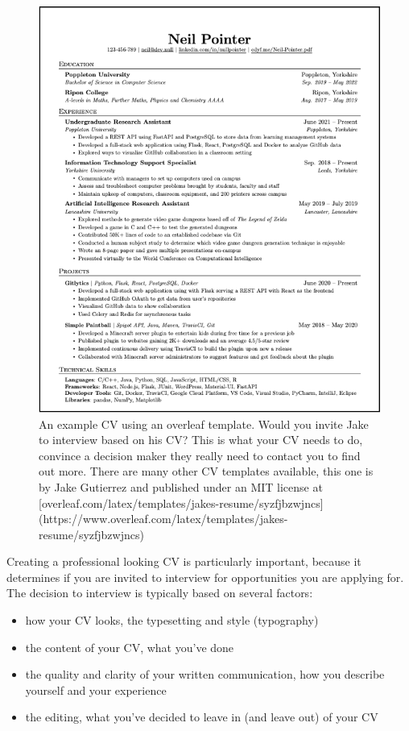 \documentclass[
]{book}
\providecommand{\tightlist}{%
  \setlength{\itemsep}{0pt}\setlength{\parskip}{0pt}}
\begin{document}
\begin{figure}

{\centering \includegraphics[width=1\linewidth]{images/jake-ryan} 

}

\caption{An example CV using an overleaf template. Would you invite Jake to interview based on his CV? This is what your CV needs to do, convince a decision maker they really need to contact you to find out more. There are many other CV templates available, this one is by Jake Gutierrez and published under an MIT license at [overleaf.com/latex/templates/jakes-resume/syzfjbzwjncs](https://www.overleaf.com/latex/templates/jakes-resume/syzfjbzwjncs)}\label{fig:cv-fig}
\end{figure}

Creating a professional looking CV is particularly important, because it determines if you are invited to interview for opportunities you are applying for. The decision to interview is typically based on several factors:

\begin{itemize}
\tightlist
\item
  how your CV looks, the typesetting and style (typography)
\item
  the content of your CV, what you've done
\item
  the quality and clarity of your written communication, how you describe yourself and your experience
\item
  the editing, what you've decided to leave in (and leave out) of your CV
\end{itemize}
\end{document}
